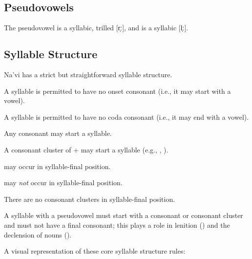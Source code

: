 \subsection{Pseudovowels} The pseudovowel  is a syllabic,
trilled [r̩ː], and  is a syllabic [l̩ː].

\subsection{Syllable Structure}
 Na'vi has a strict but straightforward syllable structure.

\begin{itemize*}
  \item A syllable is permitted to have no onset consonant (i.e., it
    may start with a vowel).
  \item A syllable is permitted to have no coda consonant (i.e., it
    may end with a vowel).
  \item Any consonant may start a syllable.
  \item A consonant cluster of  $+$  may start a syllable (e.g., , ).
  \item {} may occur in syllable-final position.
  \item {} may \textit{not} occur in syllable-final position.
  \item There are no consonant clusters in syllable-final position.
  \item \label{l-and-s:pseudo-no-null} A syllable with a pseudovowel
    must start with a consonant or consonant cluster and must not have
    a final consonant; this plays a role in lenition
    () and the declension of nouns
    ().
\end{itemize*}

\noindent A visual representation of these core syllable structure rules:

